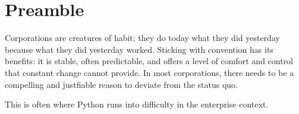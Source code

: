 \section{Preamble}

Corporations are creatures of habit; they do today what they did yesterday because what they did yesterday worked. Sticking with convention has its benefits: it is stable, often predictable, and offers a level of comfort and control that constant change cannot provide. In most corporations, there needs to be a compelling and justfiable reason to deviate from the status quo.

This is often where Python runs into difficulty in the enterprise context.
